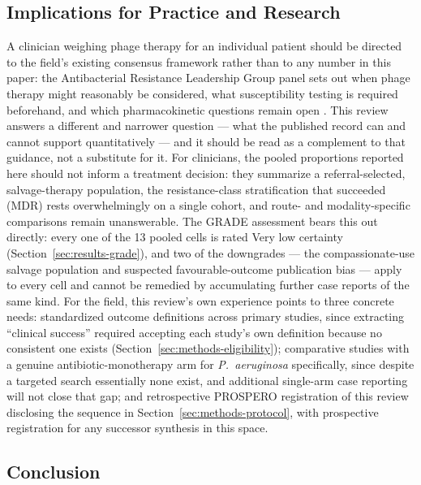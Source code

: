 \subsection{Implications for Practice and Research}
\label{sec:discussion-implications}

A clinician weighing phage therapy for an individual patient should be directed to the field's existing consensus framework rather than to any number in this paper: the Antibacterial Resistance Leadership Group panel sets out when phage therapy might reasonably be considered, what susceptibility testing is required beforehand, and which pharmacokinetic questions remain open \parencite{Suh2022_aac}. This review answers a different and narrower question --- what the published record can and cannot support quantitatively --- and it should be read as a complement to that guidance, not a substitute for it. For clinicians, the pooled proportions reported here should not inform a treatment decision: they summarize a referral-selected, salvage-therapy population, the resistance-class stratification that succeeded (MDR) rests overwhelmingly on a single cohort, and route- and modality-specific comparisons remain unanswerable. The GRADE assessment bears this out directly: every one of the 13 pooled cells is rated Very low certainty (Section~\ref{sec:results-grade}), and two of the downgrades --- the compassionate-use salvage population and suspected favourable-outcome publication bias --- apply to every cell and cannot be remedied by accumulating further case reports of the same kind. For the field, this review's own experience points to three concrete needs: standardized outcome definitions across primary studies, since extracting ``clinical success'' required accepting each study's own definition because no consistent one exists (Section~\ref{sec:methods-eligibility}); comparative studies with a genuine antibiotic-monotherapy arm for \textit{P.\ aeruginosa} specifically, since despite a targeted search essentially none exist, and additional single-arm case reporting will not close that gap; and retrospective PROSPERO registration of this review disclosing the sequence in Section~\ref{sec:methods-protocol}, with prospective registration for any successor synthesis in this space.

\subsection{Conclusion}
\label{sec:discussion-conclusion}

